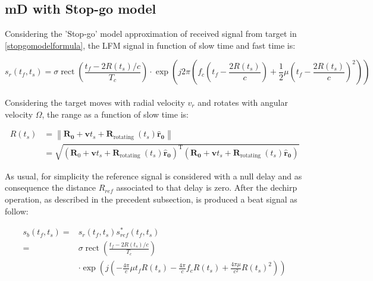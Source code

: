 \subsection{mD with Stop-go model}

Considering the 'Stop-go' model approximation of received signal from target in \ref{stopgomodelformula}, the LFM signal in function of slow time and fast time is:

\begin{equation}
s_{r}\left(t_{f}, t_{s}\right)=\sigma \operatorname{rect}\left(\frac{t_{f}-2 R\left(t_{s}\right) / c}{T_{c}}\right) \cdot \exp \left(j 2 \pi\left(f_{c}\left(t_{f}-\frac{2 R\left(t_{s}\right)}{c}\right)+\frac{1}{2} \mu\left(t_{f}-\frac{2 R\left(t_{s}\right)}{c}\right)^2\right)\right)
\end{equation}
\\
Considering the target moves with radial velocity $v_{r}$ and rotates with angular velocity $\Omega$, the range as a function of slow time is:

\begin{equation}
\begin{aligned}
R\left(t_{s}\right) &=\left\|\mathbf{R_{\text {0}}}+\mathbf{v} t_{s}+\mathbf{R}_{\text {rotating }}\left(t_{s}\right) \mathbf{\widehat{r}_\text{0}}\right\| \\
&=\sqrt{\left(\mathbf{R}_{0}+\mathbf{v} t_{s}+\mathbf{R}_{\text {rotating }}\left(t_{s}\right) \mathbf{\widehat{r}_\text{0}}\right)^{\mathrm{T}}\left(\mathbf{R_{\text{0}}}+\mathbf{v} t_{s}+\mathbf{R}_{\text {rotating }}\left(t_{s}\right) \mathbf{\widehat{r}_\text{0}}\right)}
\end{aligned}
\end{equation}

As usual, for simplicity the reference signal is considered with a null delay and as consequence the distance $R_{ref}$ associated to that delay is zero.
After the dechirp operation, as described in the precedent subsection, is produced a beat signal as follow:


\begin{equation}
\begin{aligned}
s_{b}\left(t_{f}, t_{s}\right)=& s_{r}\left(t_{f}, t_{s}\right) s_{r e f}^{*}\left(t_{f}, t_{s}\right) \\
=& \sigma \operatorname{rect}\left(\frac{t_{f}-2 R 
\left(t_{s}\right) / c}{T_{c}}\right) \\
& \cdot \exp \left(j\left(-\frac{4 \pi}{c} \mu t_{f}
R\left(t_{s}\right)-\frac{4 \pi}{c} f_{c} R\left(t_{s}\right)+\frac{4 \pi \mu}{c^{2}} R\left(t_{s}\right)^{2}\right)\right)
\end{aligned}
\label{beatstopgomodel}
\end{equation}

